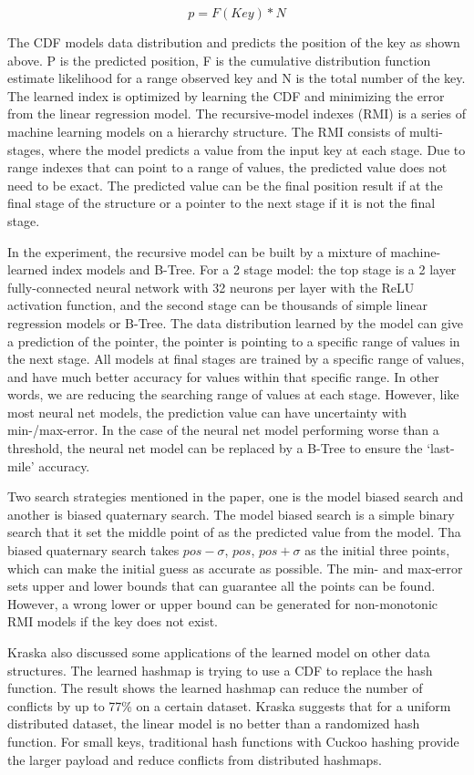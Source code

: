 \[p = F(Key) * N\]

The CDF models data distribution and predicts the position of the key as shown above. P is the predicted position, F is the cumulative distribution function estimate likelihood for a range observed key and N is the total number of the key. The learned index is optimized by learning the CDF and minimizing the error from the linear regression model. The recursive-model indexes (RMI) is a series of machine learning models on a hierarchy structure. The RMI consists of multi-stages, where the model predicts a value from the input key at each stage. Due to range indexes that can point to a range of values, the predicted value does not need to be exact. The predicted value can be the final position result if at the final stage of the structure or a pointer to the next stage if it is not the final stage. 

In the experiment, the recursive model can be built by a mixture of machine-learned index models and B-Tree. For a 2 stage model: the top stage is a 2 layer fully-connected neural network with 32 neurons per layer with the ReLU activation function, and the second stage can be thousands of simple linear regression models or B-Tree. The data distribution learned by the model can give a prediction of the pointer, the pointer is pointing to a specific range of values in the next stage. All models at final stages are trained by a specific range of values, and have much better accuracy for values within that specific range. In other words, we are reducing the searching range of values at each stage. However, like most neural net models, the prediction value can have uncertainty with min-/max-error. In the case of the neural net model performing worse than a threshold, the neural net model can be replaced by a B-Tree to ensure the ‘last-mile’ accuracy. 

Two search strategies mentioned in the paper, one is the model biased search and another is biased quaternary search. The model biased search is a simple binary search that it set the middle point of as the predicted value from the model. Tha biased quaternary search takes ${pos - \sigma}$, ${pos}$, ${pos + \sigma}$ as the initial three points, which can make the initial guess as accurate as possible. The min- and max-error sets upper and lower bounds that can guarantee all the points can be found. However, a wrong lower or upper bound can be generated for non-monotonic RMI models if the key does not exist. 

Kraska also discussed some applications of the learned model on other data structures.  The learned hashmap is trying to use a CDF to replace the hash function. The result shows the learned hashmap can reduce the number of conflicts by up to 77\% on a certain dataset. Kraska suggests that for a uniform distributed dataset, the linear model is no better than a randomized hash function. For small keys, traditional hash functions with Cuckoo hashing provide the larger payload and reduce conflicts from distributed hashmaps. 



